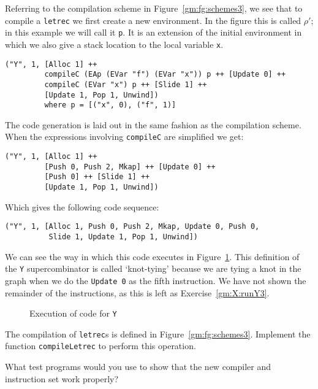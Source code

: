 Referring to the compilation scheme in Figure~\ref{gm:fg:schemes3}, we
see that to compile a \mbox{\tt letrec} we first create a new environment. In
the figure this is called $\rho'$; in this example we will call it
\mbox{\tt p}.  It is an extension of the initial environment in which we also
give a stack location to the local variable \mbox{\tt x}.
\begin{verbatim}
("Y", 1, [Alloc 1] ++
         compileC (EAp (EVar "f") (EVar "x")) p ++ [Update 0] ++
         compileC (EVar "x") p ++ [Slide 1] ++
         [Update 1, Pop 1, Unwind])
         where p = [("x", 0), ("f", 1)]
\end{verbatim}

The code generation is laid out in the same fashion as the compilation
scheme. When the expressions involving \mbox{\tt compileC} are simplified we
get:
\begin{verbatim}
("Y", 1, [Alloc 1] ++
         [Push 0, Push 2, Mkap] ++ [Update 0] ++
         [Push 0] ++ [Slide 1] ++
         [Update 1, Pop 1, Unwind])
\end{verbatim}
Which gives the following code sequence:
\begin{verbatim}
("Y", 1, [Alloc 1, Push 0, Push 2, Mkap, Update 0, Push 0,
          Slide 1, Update 1, Pop 1, Unwind])
\end{verbatim}

We can see the way in which this code executes in
Figure~\ref{gm:fg:y3}.  This definition of the \mbox{\tt Y} supercombinator is
called `knot-tying' because we are tying a knot in the graph when we
do the \mbox{\tt Update\ 0} as the fifth instruction. We have not shown the
remainder of the instructions, as this is left as
Exercise~\ref{gm:X:runY3}.
\begin{figure} %


\vspace{0.25in}


\caption{Execution of code for \mbox{\tt Y}}\label{gm:fg:y3}
\end{figure}

\begin{exercise}\label{gm:X:letrec3}
The compilation of \mbox{\tt letrec}s is defined in Figure~\ref{gm:fg:schemes3}.
Implement the function \mbox{\tt compileLetrec} to perform this operation.
\end{exercise}

\begin{exercise}\label{gm:X:test3}
What test programs would you use to show that the new compiler and
instruction set work properly?
\end{exercise}

